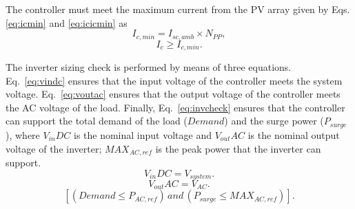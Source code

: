 \documentclass[10pt,conference]{IEEEtran}
\begin{document}
The controller must meet the maximum current from the PV array given by Eqs. \eqref{eq:icmin} and \eqref{eq:icicmin} as
\begin{equation}
\label{eq:icmin}
\scriptstyle I_{c,min} = \scriptstyle I_{sc,amb} \times \scriptstyle N_{PP},
\end{equation}
%
\begin{equation}
\label{eq:icicmin}
\scriptstyle I_{c} \geq \scriptstyle I_{c,min}.
\end{equation}

The inverter sizing check is performed by means of three equations. Eq.~\eqref{eq:vindc} ensures that the input voltage of the controller meets the system voltage. Eq.~\eqref{eq:voutac} ensures that the output voltage of the controller meets the AC voltage of the load. Finally, Eq.~\eqref{eq:invcheck} ensures that the controller can support the total demand of the load ($Demand$) and the surge power ($P_{surge}$), where $V_{in}DC$ is the nominal input voltage and $V_{out}AC$ is the nominal output voltage of the inverter; $MAX_{AC,ref}$ is the peak power that the inverter can support.
%
\begin{equation}
\label{eq:vindc} 
\scriptstyle V_{in}DC = \scriptstyle V_{system}.
\end{equation}
%
\begin{equation}
\label{eq:voutac} 
\scriptstyle V_{out}AC = \scriptstyle V_{AC}.
\end{equation}
%
\begin{equation}
\label{eq:invcheck} 
\left[ (\scriptstyle Demand \leq \scriptstyle P_{AC,ref}) \, \scriptstyle and \, \scriptstyle (P_{surge} \leq MAX_{AC,ref}) \right].
\end{equation}
\end{document}
